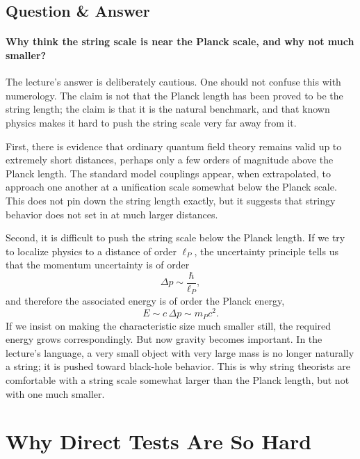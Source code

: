 \subsection{Question \& Answer}

\paragraph{Why think the string scale is near the Planck scale, and why not much smaller?}

The lecture's answer is deliberately cautious. One should not confuse this with numerology. The claim is not that the Planck length has been proved to be the string length; the claim is that it is the natural benchmark, and that known physics makes it hard to push the string scale very far away from it.

First, there is evidence that ordinary quantum field theory remains valid up to extremely short distances, perhaps only a few orders of magnitude above the Planck length. The standard model couplings appear, when extrapolated, to approach one another at a unification scale somewhat below the Planck scale. This does not pin down the string length exactly, but it suggests that stringy behavior does not set in at much larger distances.

Second, it is difficult to push the string scale below the Planck length. If we try to localize physics to a distance of order \(\ell_{P}\), the uncertainty principle tells us that the momentum uncertainty is of order
\begin{equation}
\Delta p\sim \frac{\hbar}{\ell_{P}},
\end{equation}
and therefore the associated energy is of order the Planck energy,
\begin{equation}
E\sim c\,\Delta p\sim m_{P}c^{2}.
\end{equation}
If we insist on making the characteristic size much smaller still, the required energy grows correspondingly. But now gravity becomes important. In the lecture's language, a very small object with very large mass is no longer naturally a string; it is pushed toward black-hole behavior. This is why string theorists are comfortable with a string scale somewhat larger than the Planck length, but not with one much smaller.

\section{Why Direct Tests Are So Hard}

